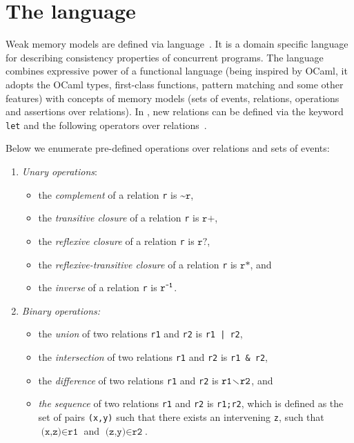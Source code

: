 \section{The \cat{} language}
\label{ch:wmm:cat}

Weak memory models are defined via \cat{} language~\cite{alglave2016syntax}.
It is a domain specific language for describing consistency properties of concurrent programs.
The language combines expressive power of a functional language (being inspired by OCaml, it adopts the OCaml types, first-class functions, pattern matching and some other features) with concepts of memory models (sets of events, relations, operations and assertions over relations).
In \cat{}, new relations can be defined via the keyword \texttt{let} and the following operators over relations~\cite{alglave2016syntax}.

Below we enumerate pre-defined operations over relations and sets of events:

\ifdefined\IsAalto
  \vspace*{1em}
\fi

\begin{enumerate}
  \item \textit{Unary operations}:
    \begin{itemize}
      \item the \textit{complement} of a relation \texttt{r} is $\texttt{\textasciitilde r}$,
      \item the \textit{transitive closure} of a relation \texttt{r} is $\texttt{r+}$,
      \item the \textit{reflexive closure} of a relation \texttt{r} is $\texttt{r?}$,
      \item the \textit{reflexive-transitive closure} of a relation \texttt{r} is $\texttt{r*}$, and
      \item the \textit{inverse} of a relation \texttt{r} is $\texttt{r}^{\texttt{-1}}$.
    \end{itemize}
  \item \textit{Binary operations:}
  \begin{itemize}
    \item the \textit{union} of two relations \texttt{r1} and \texttt{r2} is \texttt{r1\,|\,r2},
    \item the \textit{intersection} of two relations \texttt{r1} and \texttt{r2} is \texttt{r1\,\&\,r2},
      \item the \textit{difference} of two relations \texttt{r1} and \texttt{r2} is $\texttt{r1} \!\smallsetminus\! \texttt{r2}$, and
    \item \textit{the sequence} of two relations \texttt{r1} and \texttt{r2} is \texttt{r1;r2}, which is defined as the set of pairs \texttt{(x,y)} such that there exists an intervening \texttt{z}, such that $\texttt{(x,z)} \in \texttt{r1}$ and $\texttt{(z,y)} \in \texttt{r2}$.
  \end{itemize}
\end{enumerate}

